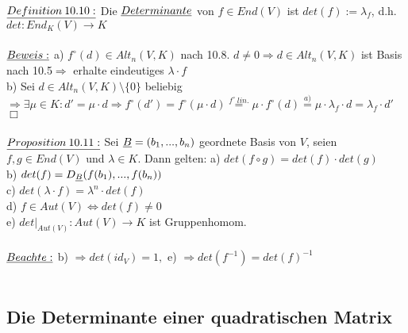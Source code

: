 \documentclass[fleqn, a4paper, 11pt]{article}
\begin{document}
\\
$\uline{Definition\:10.10:}$ Die $\uline{Determinante}$ von $f\in End(V)$ ist $det(f):=\lambda_f$, d.h. $det:End_K(V)\rightarrow K$\\
\\
$\uline{Beweis:}$ a) $f^{\circ}(d)\in Alt_n(V,K)$ nach 10.8. $d\neq 0\Rightarrow d\in Alt_n(V,K)$ ist Basis nach 10.5$\Rightarrow$ erhalte eindeutiges $\lambda\cdot f$\\
b) Sei $d\in Alt_n(V,K)\setminus\{0\}$ beliebig $\Rightarrow\exists\mu\in K:d'=\mu\cdot d\Rightarrow f^{\circ}(d')=f^{\circ}(\mu\cdot d)\stackrel{f^{\circ}\:lin.}{=}\mu\cdot f^{\circ}(d)\stackrel{a)}{=}\mu\cdot\lambda_f\cdot d=\lambda_f\cdot d'$ \hfill $\Box$\\
\\
$\uline{Proposition\:10.11:}$ Sei $\uline{B}=(b_1,...,b_n)$ geordnete Basis von $V$, seien $f,g\in End(V)$ und $\lambda\in K$. Dann gelten: a) $det(f\circ g)=det(f)\cdot det(g)$\\
b) $det(f)=D_{\uline{B}}(f(b_1),...,f(b_n))$\\
c) $det(\lambda\cdot f)=\lambda^n\cdot det(f)$\\
d) $f\in Aut(V)\Leftrightarrow det(f)\neq 0$\\
e) $det|_{Aut(V)}:Aut(V)\rightarrow K$ ist Gruppenhomom.\\
\\
$\uline{Beachte:}$ b) $\Rightarrow det(id_V)=1,$ e) $\Rightarrow det(f^{-1})=det(f)^{-1}$\\
\\
\subsection{Die Determinante einer quadratischen Matrix}
\end{document}
